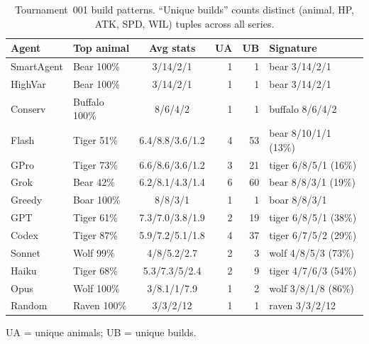 \documentclass[11pt]{article}
\begin{document}
\begin{table}[t]
\centering
\footnotesize
\caption{Tournament~001 build patterns. ``Unique builds'' counts distinct (animal, HP, ATK, SPD, WIL) tuples across all series.}
\label{tab:t1_build}
\begin{tabular}{llcrrl}
\toprule
Agent & Top animal & Avg stats & UA & UB & Signature \\
\midrule
SmartAgent & Bear 100\% & 3/14/2/1 & 1 & 1 & bear 3/14/2/1 \\
HighVar & Bear 100\% & 3/14/2/1 & 1 & 1 & bear 3/14/2/1 \\
Conserv & Buffalo 100\% & 8/6/4/2 & 1 & 1 & buffalo 8/6/4/2 \\
Flash & Tiger 51\% & 6.4/8.8/3.6/1.2 & 4 & 53 & bear 8/10/1/1 (13\%) \\
GPro & Tiger 73\% & 6.6/8.6/3.6/1.2 & 3 & 21 & tiger 6/8/5/1 (16\%) \\
Grok & Bear 42\% & 6.2/8.1/4.3/1.4 & 6 & 60 & bear 8/8/3/1 (19\%) \\
Greedy & Boar 100\% & 8/8/3/1 & 1 & 1 & boar 8/8/3/1 \\
GPT & Tiger 61\% & 7.3/7.0/3.8/1.9 & 2 & 19 & tiger 6/8/5/1 (38\%) \\
Codex & Tiger 87\% & 5.9/7.2/5.1/1.8 & 4 & 37 & tiger 6/7/5/2 (29\%) \\
Sonnet & Wolf 99\% & 4/8/5.2/2.7 & 2 & 3 & wolf 4/8/5/3 (73\%) \\
Haiku & Tiger 68\% & 5.3/7.3/5/2.4 & 2 & 9 & tiger 4/7/6/3 (54\%) \\
Opus & Wolf 100\% & 3/8.1/1/7.9 & 1 & 2 & wolf 3/8/1/8 (86\%) \\
Random & Raven 100\% & 3/3/2/12 & 1 & 1 & raven 3/3/2/12 \\
\bottomrule
\end{tabular}
\vspace{0.3em}
\noindent\footnotesize{UA = unique animals; UB = unique builds.}
\end{table}
\end{document}
